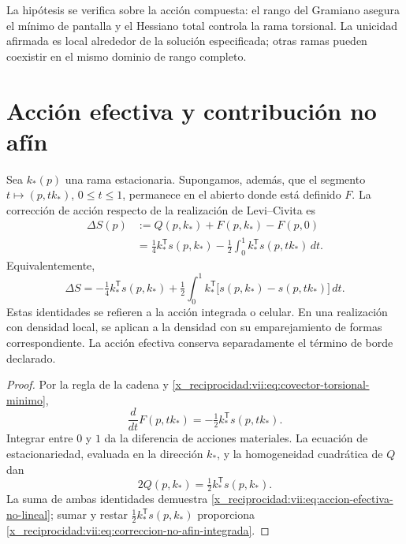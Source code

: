 La hipótesis se verifica sobre la acción compuesta: el rango del
Gramiano asegura el mínimo de pantalla y el Hessiano total controla
la rama torsional. La unicidad afirmada es local alrededor de la
solución especificada; otras ramas pueden coexistir en el mismo
dominio de rango completo.

\section{Acción efectiva y contribución no afín}
\label{x_reciprocidad:vii:subsec:accion-efectiva-no-afin}

\begin{theorem}
\label{x_reciprocidad:vii:thm:eliminacion-torsional-no-lineal}
Sea \(k_*(p)\) una rama estacionaria. Supongamos, además, que el
segmento \(t\mapsto (p,tk_*)\), \(0\leq t\leq1\), permanece
en el abierto donde está definido \(F\). La corrección de acción
respecto de la realización de Levi--Civita es
\begin{equation}
 \begin{split}
 \Delta S(p)
  &:=Q(p,k_*)+F(p,k_*)-F(p,0)\\
  &=\tfrac14 k_*^{\mathsf T}s(p,k_*)
     -\tfrac12\int_0^1
           k_*^{\mathsf T}s(p,tk_*)\,dt.
 \end{split}
 \label{x_reciprocidad:vii:eq:accion-efectiva-no-lineal}
\end{equation}
Equivalentemente,
\begin{equation}
 \Delta S=-\tfrac14 k_*^{\mathsf T}s(p,k_*)
  +\tfrac12\int_0^1 k_*^{\mathsf T}
       \bigl[s(p,k_*)-s(p,tk_*)\bigr]\,dt.
 \label{x_reciprocidad:vii:eq:correccion-no-afin-integrada}
\end{equation}
Estas identidades se refieren a la acción integrada o celular.
En una realización con densidad local, se aplican a la densidad
con su emparejamiento de formas correspondiente. La acción efectiva
conserva separadamente el término de borde declarado.
\end{theorem}

\begin{proof}
Por la regla de la cadena y
\eqref{x_reciprocidad:vii:eq:covector-torsional-minimo},
\[
 \frac{d}{dt}F(p,tk_*)
      =-\tfrac12 k_*^{\mathsf T}s(p,tk_*).
\]
Integrar entre \(0\) y \(1\) da la diferencia de acciones
materiales. La ecuación de estacionariedad, evaluada en la
dirección \(k_*\), y la homogeneidad cuadrática de \(Q\) dan
\[
 2Q(p,k_*)=\tfrac12 k_*^{\mathsf T}s(p,k_*).
\]
La suma de ambas identidades demuestra
\eqref{x_reciprocidad:vii:eq:accion-efectiva-no-lineal}; sumar y restar
\(\tfrac12k_*^{\mathsf T}s(p,k_*)\) proporciona
\eqref{x_reciprocidad:vii:eq:correccion-no-afin-integrada}.
\end{proof}

